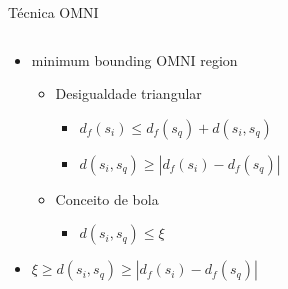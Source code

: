 \documentclass{beamer}
\begin{document}
\begin{frame}{Técnica OMNI}
    \begin{columns}
      \begin{column}{0.6\linewidth}
	\begin{itemize}
	 \item minimum bounding OMNI region\newline
	    \begin{itemize}
	      \item Desigualdade triangular\newline
		\begin{itemize}
		  \item $d_{f}(s_i) \leq d_{f}(s_q) + d(s_i, s_q)$\newline
		  
		  \item $d(s_i, s_q) \geq |d_{f}(s_i) - d_{f}(s_q)|$\newline
		\end{itemize}
	      \item Conceito de bola\newline
		\begin{itemize}
		  \item $d(s_i, s_q) \leq \xi$\newline
		\end{itemize}
	    \end{itemize}
	\item $\xi \geq d(s_i,s_q) \geq |d_f(s_i) - d_f(s_q)|$\newline
	\end{itemize}
      \end{column}
      \begin{column}{0.4\linewidth}
	    \begin{figure}[H!]

\end{figure}
\end{column}
\end{columns}
\end{frame}
\end{document}
